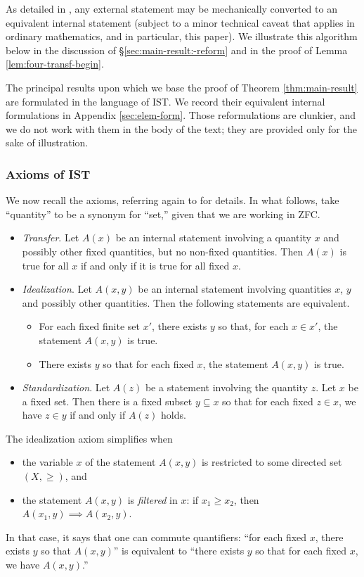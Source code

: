 As detailed in \cite[\S2]{MR469763}, any external statement may be mechanically converted to an equivalent internal statement (subject to a minor technical caveat that applies in ordinary mathematics, and in particular, this paper).  We illustrate this algorithm below in the discussion of \S\ref{sec:main-result:-reform} and in the proof of Lemma \ref{lem:four-transf-begin}.

The principal results upon which we base the proof of Theorem \ref{thm:main-result} are formulated in the language of IST.  We record their equivalent internal formulations in Appendix \ref{sec:elem-form}.  Those reformulations are clunkier, and we do not work with them in the body of the text; they are provided only for the sake of illustration.



\subsubsection{Axioms of IST}\label{sec:axioms-ist}
We now recall the axioms, referring again to \cite{MR469763} for details.  In what follows, take ``quantity'' to be a synonym for ``set,'' given that we are working in ZFC.
\begin{itemize}
\item \emph{Transfer}.  Let $A(x)$ be an internal statement involving a quantity $x$ and possibly other fixed quantities, but no non-fixed quantities.  Then $A(x)$ is true for all $x$ if and only if it is true for all fixed $x$.
\item \emph{Idealization}.  Let $A(x,y)$ be an internal statement involving quantities $x$, $y$ and possibly other quantities.  Then the following statements are equivalent.
  \begin{itemize}
  \item For each fixed finite set $x'$, there exists $y$ so that, for each $x \in x'$, the statement $A(x,y)$ is true.
  \item There exists $y$ so that for each fixed $x$, the statement $A(x,y)$ is true.
  \end{itemize}
\item \emph{Standardization}.  Let $A(z)$ be a statement involving the quantity $z$.  Let $x$ be a fixed set.  Then there is a fixed subset $y \subseteq x$ so that for each fixed $z \in x$, we have $z \in y$ if and only if $A(z)$ holds.
\end{itemize}

The idealization axiom simplifies when
\begin{itemize}
\item the variable $x$ of the statement $A(x,y)$ is restricted to some directed set $(X, \geq)$, and
\item the statement $A(x,y)$ is \emph{filtered} in $x$: if $x_1 \geq x_2$, then $A(x_1,y) \implies A(x_2,y)$.
\end{itemize}
In that case, it says that one can commute quantifiers: ``for each fixed $x$, there exists $y$ so that $A(x,y)$'' is equivalent to ``there exists $y$ so that for each fixed $x$, we have $A(x,y)$.''

